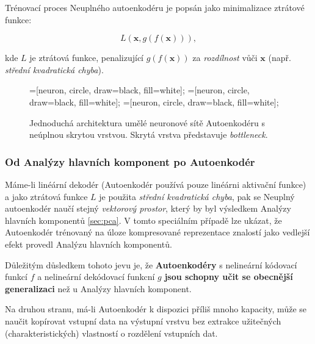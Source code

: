Trénovací proces Neuplného autoenkodéru je popsán jako minimalizace ztrátové funkce:

\begin{equation}
    L(\mathbf{x}, g(f(\mathbf{x}))),
\end{equation}

kde $L$ je ztrátová funkce, penalizující $g(f(\mathbf{x}))$ za \emph{rozdílnost} vůči $\mathbf{x}$ (např. \emph{střední kvadratická chyba}).


\begin{figure}[H]
    \centering
    \begin{neuralnetwork}[height=4]
        =[neuron, circle, draw=black, fill=white];
        =[neuron, circle, draw=black, fill=white];
        =[neuron, circle, draw=black, fill=white];
      
      
      
        \hiddenlayer[count=2, bias=false, title=Kód $\emph{h}$]
        \linklayers
      
        \outputlayer[count=4, title=Dekodér, text=\xout]
        \linklayers
      
      \end{neuralnetwork}
    \caption{Jednoduchá architektura umělé neuronové sítě Autoenkodéru s neúplnou skrytou vrstvou. Skrytá vrstva představuje \emph{bottleneck}.}
    \label{fig:autoencoder_bottleneck}
\end{figure}
\subsubsection{Od Analýzy hlavních komponent po Autoenkodér}
Máme-li linéární dekodér (Autoenkodér používá pouze linéárni aktivační funkce) a jako ztrátová funkce $L$ je použita \emph{střední kvadratická chyba},
pak se Neuplný autoenkodér naučí stejný \emph{vektorový prostor}, který by byl výsledkem Analýzy hlavních komponentů \autoref{sec:pca}.
V tomto speciálním případě lze ukázat, že Autoenkodér trénovaný na úloze kompresované reprezentace znalostí jako vedlejší efekt provedl Analýzu hlavních komponentů.

Důležitým důsledkem tohoto jevu je, že \textbf{Autoenkodéry} s nelineární kódovací funkcí $f$
a nelineární dekódovací funkcní $g$ \textbf{jsou schopny učit se obecnější generalizaci}
než u Analýzy hlavních komponent.

Na druhou stranu, má-li Autoenkodér k dispozici příliš mnoho kapacity,
může se naučit kopírovat vstupní data na výstupní vrstvu bez extrakce užitečných (charakteristických) vlastností o rozdělení vstupních dat.


